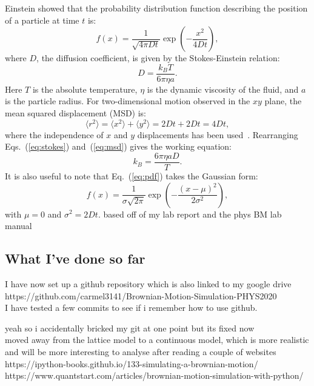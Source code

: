 \documentclass[12pt]{article}
\begin{document}
Einstein showed that the probability distribution function describing the position
of a particle at time $t$ is:
\begin{equation}
    f(x) = \frac{1}{\sqrt{4\pi D t}} \exp\!\left(-\frac{x^2}{4Dt}\right),
    \label{eq:pdf}
\end{equation}
where $D$, the diffusion coefficient, is given by the Stokes-Einstein relation:
\begin{equation}
    D = \frac{k_B T}{6\pi \eta a}.
    \label{eq:stokes}
\end{equation}
Here $T$ is the absolute temperature, $\eta$ is the dynamic viscosity of the
fluid, and $a$ is the particle radius. For two-dimensional motion observed in the
$xy$ plane, the mean squared displacement (MSD) is:
\begin{equation}
    \langle r^2 \rangle = \langle x^2 \rangle + \langle y^2 \rangle = 2Dt + 2Dt = 4Dt,
    \label{eq:msd}
\end{equation}
where the independence of $x$ and $y$ displacements has been
used~\cite{reif1965}. Rearranging Eqs.~(\ref{eq:stokes}) and~(\ref{eq:msd})
gives the working equation:
\begin{equation}
    k_B = \frac{6\pi\eta a D}{T}.
    \label{eq:kB}
\end{equation}
It is also useful to note that Eq.~(\ref{eq:pdf}) takes the Gaussian form:
\begin{equation}
    f(x) = \frac{1}{\sigma \sqrt{2\pi}} \exp\!\left(-\frac{(x - \mu)^2}{2\sigma^2}\right),
    \label{eq:gaussian}
\end{equation}
with $\mu = 0$ and $\sigma^2 = 2Dt$.
based off of my lab report and the phys BM lab manual

\subsection{What I've done so far}
I have now set up a github repository which is also linked to my google drive\\
https://github.com/carmel3141/Brownian-Motion-Simulation-PHYS2020\\
I have tested a few commits to see if i remember how to use github.

yeah so i accidentally bricked my git at one point but its fixed now\\

moved away from the lattice model to a continuous model, which is more realistic and will be more interesting to analyse after reading a couple of websites \\
https://ipython-books.github.io/133-simulating-a-brownian-motion/ \\
https://www.quantstart.com/articles/brownian-motion-simulation-with-python/ \\
\end{document}
